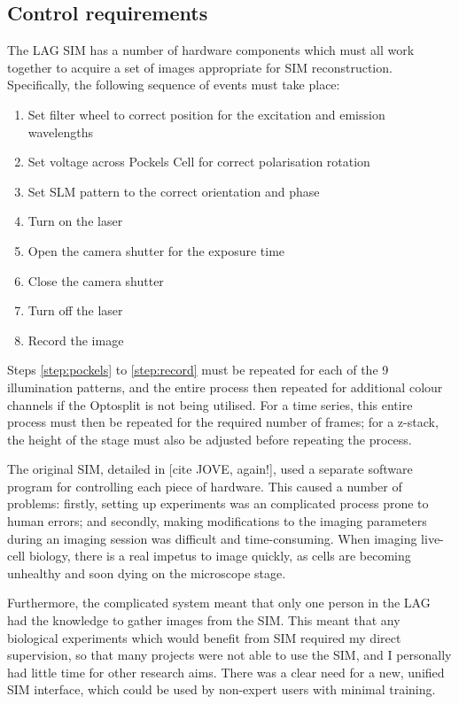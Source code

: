 \subsection{Control requirements} \label{sec:SIMsteps}
The LAG SIM has a number of hardware components which must all work together to acquire a set of images appropriate for SIM reconstruction.
Specifically, the following sequence of events must take place:
\begin{enumerate}
	\item Set filter wheel to correct position for the excitation and emission wavelengths
	\item\label{step:pockels} Set voltage across Pockels Cell for correct polarisation rotation
	\item Set SLM pattern to the correct orientation and phase
	\item Turn on the laser
	\item Open the camera shutter for the exposure time
	\item Close the camera shutter
	\item Turn off the laser
	\item\label{step:record} Record the image
\end{enumerate}
Steps \ref{step:pockels} to \ref{step:record} must be repeated for each of the 9 illumination patterns, and the entire process then repeated for additional colour channels if the Optosplit is not being utilised. 
For a time series, this entire process must then be repeated for the required number of frames; for a z-stack, the height of the stage must also be adjusted before repeating the process. 

The original SIM, detailed in [cite JOVE, again!], used a separate software program for controlling each piece of hardware. 
This caused a number of problems: firstly, setting up experiments was an complicated process prone to human errors; and secondly, making modifications to the imaging parameters during an imaging session was difficult and time-consuming. 
When imaging live-cell biology, there is a real impetus to image quickly, as cells are becoming unhealthy and soon dying on the microscope stage. 

Furthermore, the complicated system meant that only one person in the LAG had the knowledge to gather images from the SIM. 
This meant that any biological experiments which would benefit from SIM required my direct supervision, so that many projects were not able to use the SIM, and I personally had little time for other research aims.
There was a clear need for a new, unified SIM interface, which could be used by non-expert users with minimal training. 

